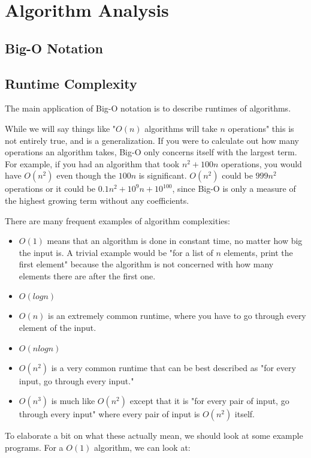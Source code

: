 \section{Algorithm Analysis}
\subsection{Big-O Notation}



\subsection{Runtime Complexity}

The main application of Big-O notation is to describe runtimes of algorithms.

While we will say things like "$O(n)$ algorithms will take $n$ operations" this is not entirely true, and is a generalization. If you were to calculate out how many operations an algorithm takes, Big-O only concerns itself with the largest term. For example, if you had an algorithm that took $n^2 + 100n$ operations, you would have $O(n^2)$ even though the $100n$ is significant. $O(n^2)$ could be $999n^2$ operations or it could be $0.1n^2 + 10^9n + 10^{100}$, since Big-O is only a measure of the highest growing term without any coefficients.

There are many frequent examples of algorithm complexities:

\begin{itemize}
\item $O(1)$ means that an algorithm is done in constant time, no matter how big the input is. A trivial example would be "for a list of $n$ elements, print the first element" because the algorithm is not concerned with how many elements there are after the first one.
\item $O(log n)$
\item $O(n)$ is an extremely common runtime, where you have to go through every element of the input.
\item $O(n log n)$
\item $O(n^2)$ is a very common runtime that can be best described as "for every input, go through every input."
\item $O(n^3)$ is much like $O(n^2)$ except that it is "for every pair of input, go through every input" where every pair of input is $O(n^2)$ itself.
\end{itemize}

To elaborate a bit on what these actually mean, we should look at some example programs. For a $O(1)$ algorithm, we can look at:

